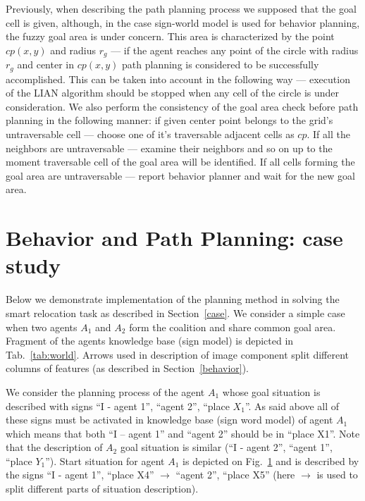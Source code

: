 \documentclass[runningheads,a4paper]{llncs}
\begin{document}
Previously, when describing the path planning process we supposed that the goal cell is given, although, in the case sign-world model is used for behavior planning, the fuzzy goal area is under concern. This area is characterized by the point $cp(x, y)$ and radius $r_g$ --- if the agent reaches any point of the circle with radius $r_g$ and center in $cp(x, y)$ path planning is considered to be successfully accomplished. This can be taken into account in the following way --- execution of the LIAN algorithm should be stopped when any cell of the circle is under consideration. We also perform the consistency of the goal area check before path planning in the following manner: if given center point belongs to the grid's untraversable cell --- choose one of it's traversable adjacent cells as $cp$. If all the neighbors are untraversable --- examine their neighbors and so on up to the moment traversable cell of the goal area will be identified. If all cells forming the goal area are untraversable --- report  behavior planner and wait for the new goal area. 

\section{Behavior and Path Planning: case study}\label{example}

Below we demonstrate implementation of the planning method in solving the smart relocation task as described in Section~\ref{case}. We consider a simple case when two agents $A_1$ and $A_2$ form the coalition and share common goal area. Fragment of the agents knowledge base (sign model) is depicted in Tab.~\ref{tab:world}. Arrows used in description of image component split different columns of features (as described in Section~\ref{behavior}).

We consider the planning process of the agent $A_1$ whose goal situation is described with signs ``I - agent 1'', ``agent 2'', ``place $X_1$''. As said above all of these signs must be activated in knowledge base (sign word model) of agent $A_1$ which means that both ``I – agent 1'' and ``agent 2'' should be in ``place X1''. Note that the description of $A_2$ goal situation is similar (``I - agent 2'', ``agent 1'', ``place $Y_1$''). Start situation for agent $A_1$ is depicted on Fig.~\ref{example} and is described by the signs ``I - agent 1'', ``place X4'' $\rightarrow$  ``agent 2'', ``place X5'' (here $\rightarrow$ is used to split different parts of situation description).
\end{document}
